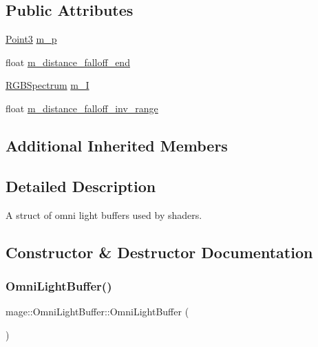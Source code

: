 \subsection*{Public Attributes}
\begin{DoxyCompactItemize}
\item 
\hyperlink{structmage_1_1_point3}{Point3} \hyperlink{structmage_1_1_omni_light_buffer_a777b98a686a7e39bd7b401748629d9fc}{m\+\_\+p}
\item 
float \hyperlink{structmage_1_1_omni_light_buffer_ae7b062ead5c4a3225100b7a9b0551f7f}{m\+\_\+distance\+\_\+falloff\+\_\+end}
\item 
\hyperlink{structmage_1_1_r_g_b_spectrum}{R\+G\+B\+Spectrum} \hyperlink{structmage_1_1_omni_light_buffer_ac3273113ad647103c911bbbf6bb41697}{m\+\_\+I}
\item 
float \hyperlink{structmage_1_1_omni_light_buffer_ad852b5cdf1751e860a2549aaa5f20769}{m\+\_\+distance\+\_\+falloff\+\_\+inv\+\_\+range}
\end{DoxyCompactItemize}
\subsection*{Additional Inherited Members}


\subsection{Detailed Description}
A struct of omni light buffers used by shaders. 

\subsection{Constructor \& Destructor Documentation}
\hypertarget{structmage_1_1_omni_light_buffer_a2cb95cb8ba07182d04b610b1c4c49be1}{}\label{structmage_1_1_omni_light_buffer_a2cb95cb8ba07182d04b610b1c4c49be1} 
\subsubsection{\texorpdfstring{Omni\+Light\+Buffer()}{OmniLightBuffer()}\hspace{0.1cm}{\footnotesize\ttfamily [1/3]}}
{\footnotesize\ttfamily mage\+::\+Omni\+Light\+Buffer\+::\+Omni\+Light\+Buffer (\begin{DoxyParamCaption}{ }\end{DoxyParamCaption})}

